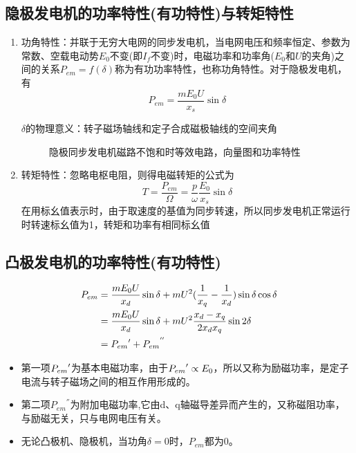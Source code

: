 \documentclass[blue]{elegantnote}
\begin{document}
\subsection{隐极发电机的功率特性(有功特性)与转矩特性}
\begin{enumerate}
	\item 功角特性：并联于无穷大电网的同步发电机，当电网电压和频率恒定、参数为常数、空载电动势$E_0$不变(即$I_f$不变)时，电磁功率和功率角($E_0$和$U$的夹角)之间的关系$P_{em}=f(\delta)$称为有功功率特性，也称功角特性。对于隐极发电机，有$$\boxed{P_{em}=\frac{mE_0U}{x_s}\sin\delta}$$
	\begin{note}
		$\delta$的物理意义：转子磁场轴线和定子合成磁极轴线的空间夹角
	\end{note}	

	\begin{figure}[!hbtp]
		\centering
		\caption{隐极同步发电机磁路不饱和时等效电路，向量图和功率特性}      
	\end{figure}
		\item 转矩特性：忽略电枢电阻，则得电磁转矩的公式为
		$$T=\frac{P_{em}}{\Omega}=\frac{p}{\omega}\frac{E_0}{x_s}\sin\delta$$	
		在用标幺值表示时，由于取速度的基值为同步转速，所以同步发电机正常运行时转速标幺值为1，转矩和功率有相同标幺值
\end{enumerate}
\subsection{凸极发电机的功率特性(有功特性)}
	\begin{displaymath}
	\begin{aligned}
			P_{em} &= \frac{mE_0U}{x_d}\sin\delta+mU^2(\frac{1}{x_q}-\frac{1}{x_d})\sin\delta\cos\delta\\
			&=\frac{mE_0U}{x_d}\sin\delta+mU^2\frac{x_d-x_q}{2x_dx_q}\sin2\delta\\
			&= {P_{em}}\rq+{P_{em}}^{''}
	\end{aligned}                                     
	\end{displaymath}
\begin{itemize}
	\item 第一项${P_{em}}\rq$为基本电磁功率，由于${P_{em}}\rq\propto E_0$，所以又称为励磁功率，是定子电流与转子磁场之间的相互作用形成的。
	\item
	第二项${P_{em}}^{''}$为附加电磁功率,它由d、q轴磁导差异而产生的，又称磁阻功率，与励磁无关，只与电网电压有关。
	\item 无论凸极机、隐极机，当功角$\delta=0$时，$P_{em}$都为0。
\end{itemize}
\end{document}
